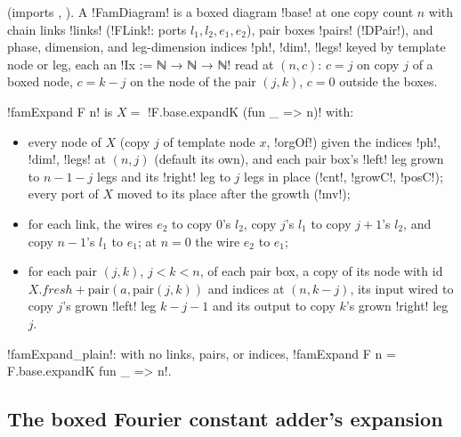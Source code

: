 { (imports , ). A \lbx!FamDiagram! is a boxed diagram \lbx!base! at one copy count $n$ with chain links \lbx!links! (\lbx!FLink!: ports $l_1,l_2,e_1,e_2$), pair boxes \lbx!pairs! (\lbx!DPair!), and phase, dimension, and leg-dimension indices \lbx!ph!, \lbx!dim!, \lbx!legs! keyed by template node or leg, each an \lbx!Ix := ℕ → ℕ → ℕ! read at $(n,c)$: $c=j$ on copy $j$ of a boxed node, $c=k-j$ on the node of the pair $(j,k)$, $c=0$ outside the boxes.

\begin{definition}\label{def:boxes-famExpand}
\lbx!famExpand F n! is $X=$ \lbx!F.base.expandK (fun _ => n)! with:
\begin{itemize}
\item every node of $X$ (copy $j$ of template node $x$, \lbx!orgOf!) given the indices \lbx!ph!, \lbx!dim!, \lbx!legs! at $(n,j)$ (default its own), and each pair box's \lbx!left! leg grown to $n-1-j$ legs and its \lbx!right! leg to $j$ legs in place (\lbx!cnt!, \lbx!growC!, \lbx!posC!); every port of $X$ moved to its place after the growth (\lbx!mv!);
\item for each link, the wires $e_2$ to copy $0$'s $l_2$, copy $j$'s $l_1$ to copy $j+1$'s $l_2$, and copy $n-1$'s $l_1$ to $e_1$; at $n=0$ the wire $e_2$ to $e_1$;
\item for each pair $(j,k)$, $j<k<n$, of each pair box, a copy of its node with id $X.\mathit{fresh}+\mathrm{pair}(a,\mathrm{pair}(j,k))$ and indices at $(n,k-j)$, its input wired to copy $j$'s grown \lbx!left! leg $k-j-1$ and its output to copy $k$'s grown \lbx!right! leg $j$.
\end{itemize}
\lbx!famExpand_plain!: with no links, pairs, or indices, \lbx!famExpand F n = F.base.expandK fun _ => n!.
\end{definition}

\subsection{The boxed Fourier constant adder's expansion}\label{sec:boxes-famfca-expand}

}
